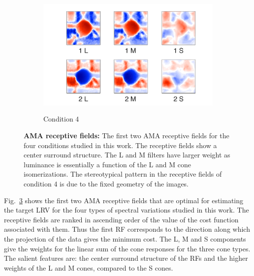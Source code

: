 \documentclass{jov}
\begin{document}
\begin{figure}
\begin{subfigure}{0.21 \textwidth}
	\label{fig:case3Filter}
    \end{subfigure}
    ~ ~ ~
        \begin{subfigure}{0.21 \textwidth}
	\caption{Condition 4}
	\includegraphics[width=\textwidth]{../FiguresDraft4/Figure14/Figure14_d.pdf}
	\label{fig:case4Filter}
    \end{subfigure}
\caption{{\bf AMA receptive fields:} The first two AMA receptive fields for the four conditions studied in this work. The receptive fields show a center surround structure. The L and M filters have larger weight as luminance is essentially a function of the L and M cone isomerizations. The stereotypical pattern in the receptive fields of condition 4 is due to the fixed geometry of the images.}
 \label{fig:AMAFilters}
\end{figure}

Fig.~\ref{fig:AMAFilters} shows the first two AMA receptive fields that are optimal for estimating the target LRV for the four types of spectral variations studied in this work. The receptive fields are ranked in ascending order of the value of the cost function associated with them. Thus the first RF corresponds to the direction along which the projection of the data gives the minimum cost. The L, M and S components give the weights for the linear sum of the cone responses for the three cone types. The salient features are: the center surround structure of the RFs and the higher weights of the L and M cones, compared to the S cones. 
\end{document}
